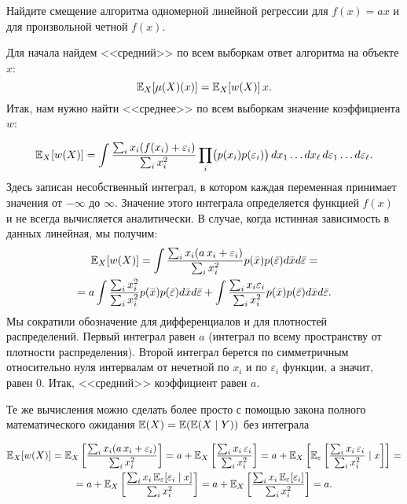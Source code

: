 \documentclass[12pt,fleqn]{article}
\begin{document}
\begin{vkProblem}
    Найдите смещение алгоритма одномерной линейной регрессии для $f(x) = ax$ и для произвольной четной $f(x)$. 
\end{vkProblem}
\begin{esSolution}
    Для начала найдем <<средний>> по всем выборкам ответ алгоритма на объекте $x$:
    \[
    \mathbb{E}_{X}[\mu(X)(x)] = \mathbb{E}_{X}[w(X)] \, x.
    \]
    Итак, нам нужно найти <<среднее>> по всем выборкам значение коэффициента $w$:
    
    \begin{equation}
    \label{k_eq}
    \mathbb{E}_{X}[w(X)] = \int \frac{\sum_i x_i (f(x_i)+\varepsilon_i)}{\sum_i x_i^2} \prod_i \bigl( p(x_i) p(\varepsilon_i) \bigr) \, dx_1 \dots dx_\ell \, d\varepsilon_1 \dots d\varepsilon_\ell.
    \end{equation}
    Здесь записан несобственный интеграл, в котором каждая переменная принимает значения от $-\infty$ до $\infty$. Значение этого интеграла определяется функцией $f(x)$ и не всегда вычисляется аналитически. В случае, когда истинная зависимость в данных линейная, мы получим:
    \begin{multline*}
    \mathbb{E}_{X}[w(X)] =  \int \frac{\sum_i x_i (a\,x_i+\varepsilon_i)}{\sum_i x_i^2}  p(\bar x) p(\bar \varepsilon)  d \bar x d \bar \varepsilon = \\ = a \int \frac{\sum_i x_i^2}{\sum_i x_i^2}  p(\bar x)  p(\bar \varepsilon)  d \bar x d \bar \varepsilon +
    \int \frac{\sum_i x_i \varepsilon_i}{\sum_i x_i^2}  p(\bar x)  p(\bar \varepsilon)  d \bar x d \bar \varepsilon.
    \end{multline*}
    Мы сократили обозначение для дифференциалов и для плотностей распределений. Первый интеграл равен $a$ (интеграл по всему пространству от плотности распределения). Второй интеграл берется по симметричным относительно нуля интервалам от нечетной по $x_i$ и по $\varepsilon_i$ функции, а значит, равен 0. Итак, <<средний>> коэффициент равен $a$.

    Те же вычисления можно сделать более просто с помощью закона полного математического ожидания $\mathbb{E}(X) = \mathbb{E}(\mathbb{E}(X \mid Y))$ без интеграла

    \begin{multline*} 
    \mathbb{E}_{X}[w(X)] =  \mathbb{E}_{X} \left[  \frac{\sum_i x_i (a\,x_i+\varepsilon_i)}{\sum_i x_i^2} \right] = a + \mathbb{E}_{X} \left[  \frac{\sum_i x_i \, \varepsilon_i}{\sum_i x_i^2} \right] =  a + \mathbb{E}_{X} \left[\mathbb{E}_{\varepsilon} \left[ \frac{\sum_i x_i \, \varepsilon_i}{\sum_i x_i^2} \mid x\right] \right] = \\ = a + \mathbb{E}_{X} \left[\frac{\sum_i x_i \, \mathbb{E}_{\varepsilon} [\varepsilon_i \mid x]}{\sum_i x_i^2} \right] = a + \mathbb{E}_{X} \left[\frac{\sum_i x_i \, \mathbb{E}_{\varepsilon} [\varepsilon_i]}{\sum_i x_i^2} \right] = a.
    \end{multline*}
        

\end{esSolution}
\end{document}
